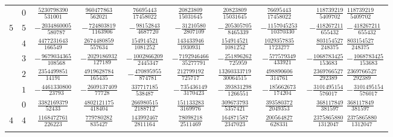 \begin{table}
\begin{center}
\begin{tabular}{ccccccccc}
           &  $0$  &  $ \frac{ 5230798390}{ 531001} $  &  $ \frac{  960477863}{  562021}$  &  $ \frac{   76695443}{17458022}$  &  $ \frac{  20823809}{15031645}$  &  $ \frac{   20823809}{15031645}$  &  $ \frac{  76695443}{17458022} $  &  $ \frac{ 118739219}{5409702}$  $ \frac{ 118739219}{5409702}$  \\ \addlinespace
      $5$  &  $5$  &  $-\frac{ 2034860005}{ 580787} $  &  $-\frac{  724803819}{ 1163906}$  &  $-\frac{   98152843}{ 4687720}$  &  $-\frac{  31210580}{ 2807109}$  &  $-\frac{  205305705}{ 8465339}$  &  $-\frac{1157045253}{10370330} $  &  $-\frac{ 418267211}{ 655432}$  $-\frac{ 418267211}{ 655432}$  \\ \addlinespace
           &  $4$  &  $ \frac{ 4477231643}{ 166549} $  &  $ \frac{ 2674480859}{  557634}$  &  $ \frac{  154914521}{ 1081252}$  &  $ \frac{ 143433946}{ 1930931}$  &  $ \frac{  154914521}{ 1081252}$  &  $ \frac{1029357835}{ 1723277} $  &  $ \frac{ 803154527}{ 248375}$  $ \frac{ 803154527}{ 248375}$  \\ \addlinespace
           &  $3$  &  $-\frac{ 9679034365}{ 108568} $  &  $-\frac{ 2029186932}{  127189}$  &  $-\frac{ 1002866209}{ 2445347}$  &  $-\frac{7192946466}{35277791}$  &  $-\frac{  251896262}{  725959}$  &  $-\frac{ 577579349}{  433921} $  &  $-\frac{1068783425}{ 153683}$  $-\frac{1068783425}{ 153683}$  \\ \addlinespace
           &  $2$  &  $ \frac{ 2354499851}{  14191} $  &  $ \frac{ 4919628784}{  165435}$  &  $-\frac{  470895955}{  874781}$  &  $ \frac{ 212799192}{  725717}$  &  $ \frac{13260333719}{30064515}$  &  $ \frac{ 498890606}{  314761} $  &  $ \frac{2369766527}{ 292389}$  $ \frac{2369766527}{ 292389}$  \\ \addlinespace
           &  $1$  &  $-\frac{ 4461330800}{  23793} $  &  $-\frac{ 2609137409}{   77728}$  &  $ \frac{  337717185}{  538487}$  &  $-\frac{ 735436149}{ 3170423}$  &  $-\frac{  393831298}{ 1266551}$  &  $-\frac{ 185662673}{  174204} $  &  $-\frac{3101495154}{ 576017}$  $-\frac{3101495154}{ 576017}$  \\ \addlinespace
           &  $0$  &  $ \frac{ 3382169379}{  52433} $  &  $ \frac{ 4802121175}{  418404}$  &  $ \frac{  266980515}{ 2188712}$  &  $ \frac{ 151133283}{ 3169976}$  &  $ \frac{  309673793}{ 5357421}$  &  $ \frac{ 393580372}{ 2049353} $  &  $ \frac{ 368117849}{ 381597}$  $ \frac{ 368117849}{ 381597}$  \\ \addlinespace
      $4$  &  $4$  &  $ \frac{ 1168472761}{ 226223} $  &  $ \frac{  779780282}{  835427}$  &  $ \frac{  143992467}{ 2811164}$  &  $ \frac{  78098218}{ 2511469}$  &  $ \frac{  164871587}{ 2347023}$  &  $ \frac{ 200564827}{  628331} $  &  $ \frac{2375865880}{1312047}$  $ \frac{2375865880}{1312047}$  \\ \addlinespace

\end{tabular}
\end{center}
\end{table}
